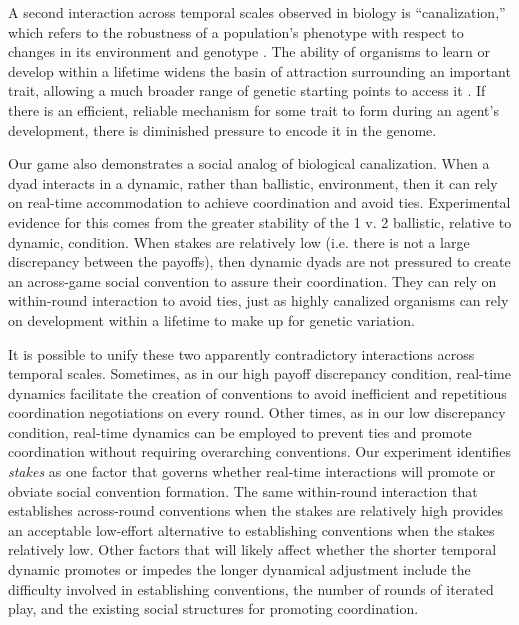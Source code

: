 \documentclass[10pt,letterpaper]{article}
\begin{document}
A second interaction across temporal scales observed in biology is ``canalization,'' which refers to the robustness of a population's phenotype with respect to changes in its environment and genotype \cite{Waddington42_Canalization}. The ability of organisms to learn or develop within a lifetime widens the basin of attraction surrounding an important trait, allowing a much broader range of genetic starting points to access it \cite{ HintonNowlan87_LearningGuidesEvolution}. If there is an efficient, reliable mechanism for some trait to form during an agent's development, there is diminished pressure to encode it in the genome.

Our game also demonstrates a social analog of biological canalization.  When a dyad interacts in a dynamic, rather than ballistic, environment, then it can rely on real-time accommodation to achieve coordination and avoid ties.  Experimental evidence for this comes from the greater stability of the 1 v. 2 ballistic, relative to dynamic, condition.  When stakes are relatively low (i.e. there is not a large discrepancy between the payoffs), then dynamic dyads are not pressured to create an across-game social convention to assure their coordination.  They can rely on within-round interaction to avoid ties, just as highly canalized organisms can rely on development within a lifetime to make up for genetic variation.

It is possible to unify these two apparently contradictory interactions across temporal scales.  Sometimes, as in our high payoff discrepancy condition, real-time dynamics facilitate the creation of conventions to avoid inefficient and repetitious coordination negotiations on every round.  Other times, as in our low discrepancy condition, real-time dynamics can be employed to prevent ties and promote coordination without requiring overarching conventions.  Our experiment identifies \emph{stakes} as one factor that governs whether real-time interactions will promote or obviate social convention formation.  The same within-round interaction that establishes across-round conventions when the stakes are relatively high provides an acceptable low-effort alternative to establishing conventions when the stakes relatively low.  Other factors that will likely affect whether the shorter temporal dynamic promotes or impedes the longer dynamical adjustment include the difficulty involved in establishing conventions, the number of rounds of iterated play, and the existing social structures for promoting coordination.
\end{document}
